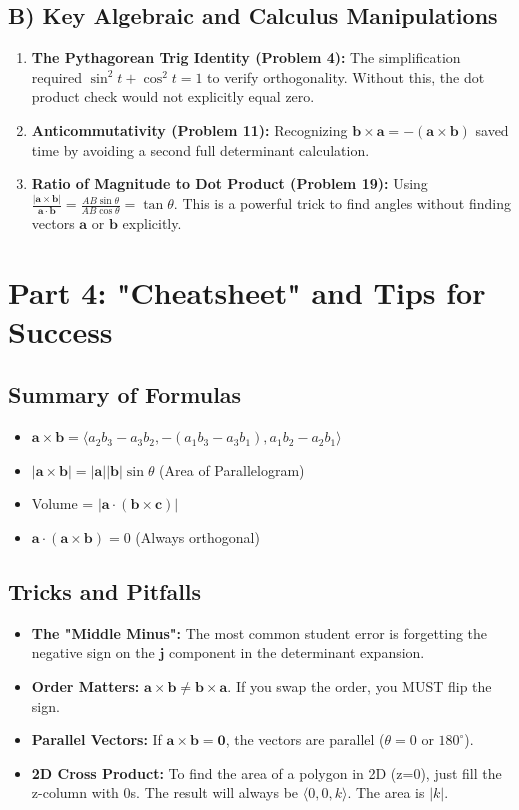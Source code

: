 \documentclass[11pt]{article}
\renewcommand{\vec}[1]{\mathbf{#1}}
\newcommand{\jhat}{\mathbf{j}}
\begin{document}
\subsection{B) Key Algebraic and Calculus Manipulations}
\begin{enumerate}
    \item \textbf{The Pythagorean Trig Identity (Problem 4):} The simplification required $\sin^2 t + \cos^2 t = 1$ to verify orthogonality. Without this, the dot product check would not explicitly equal zero.
    \item \textbf{Anticommutativity (Problem 11):} Recognizing $\vec{b} \times \vec{a} = -(\vec{a} \times \vec{b})$ saved time by avoiding a second full determinant calculation.
    \item \textbf{Ratio of Magnitude to Dot Product (Problem 19):} Using $\frac{|\vec{a} \times \vec{b}|}{\vec{a} \cdot \vec{b}} = \frac{AB \sin \theta}{AB \cos \theta} = \tan \theta$. This is a powerful trick to find angles without finding vectors $\vec{a}$ or $\vec{b}$ explicitly.
\end{enumerate}

\section{Part 4: "Cheatsheet" and Tips for Success}

\subsection{Summary of Formulas}
\begin{itemize}
    \item $\vec{a} \times \vec{b} = \langle a_2b_3 - a_3b_2, -(a_1b_3 - a_3b_1), a_1b_2 - a_2b_1 \rangle$
    \item $|\vec{a} \times \vec{b}| = |\vec{a}| |\vec{b}| \sin \theta$ (Area of Parallelogram)
    \item Volume = $|\vec{a} \cdot (\vec{b} \times \vec{c})|$
    \item $\vec{a} \cdot (\vec{a} \times \vec{b}) = 0$ (Always orthogonal)
\end{itemize}

\subsection{Tricks and Pitfalls}
\begin{itemize}
    \item \textbf{The "Middle Minus":} The most common student error is forgetting the negative sign on the $\jhat$ component in the determinant expansion.
    \item \textbf{Order Matters:} $\vec{a} \times \vec{b} \neq \vec{b} \times \vec{a}$. If you swap the order, you MUST flip the sign.
    \item \textbf{Parallel Vectors:} If $\vec{a} \times \vec{b} = \vec{0}$, the vectors are parallel ($\theta = 0$ or $180^\circ$).
    \item \textbf{2D Cross Product:} To find the area of a polygon in 2D (z=0), just fill the z-column with 0s. The result will always be $\langle 0, 0, k \rangle$. The area is $|k|$.
\end{itemize}
\end{document}
